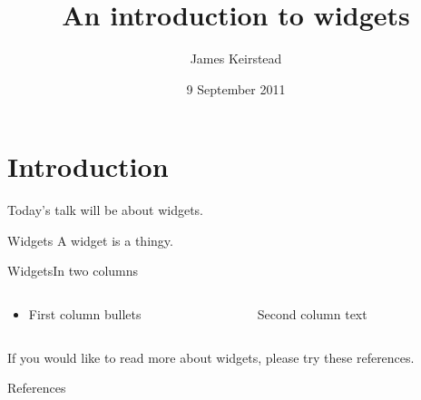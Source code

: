 
\title{An introduction to widgets}
\date{9 September 2011}
\author{James Keirstead}



\begin{frame}
\maketitle
\end{frame}


\section{Introduction}
Today's talk will be about widgets.  

\begin{frame}{Widgets}
A widget is a thingy.
\end{frame}

\begin{frame}{Widgets}{In two columns}
\begin{columns}[t]
\begin{column}{0.5\textwidth}
\begin{itemize}
\item First column bullets
\end{itemize}
\end{column}
\pause %
\begin{column}{0.5\textwidth}
Second column text \citep{Body2000}
\end{column}
\end{columns}
\end{frame}

If you would like to read more about widgets, please try these references.
\begin{frame}[allowframebreaks]{References}


\end{frame}


